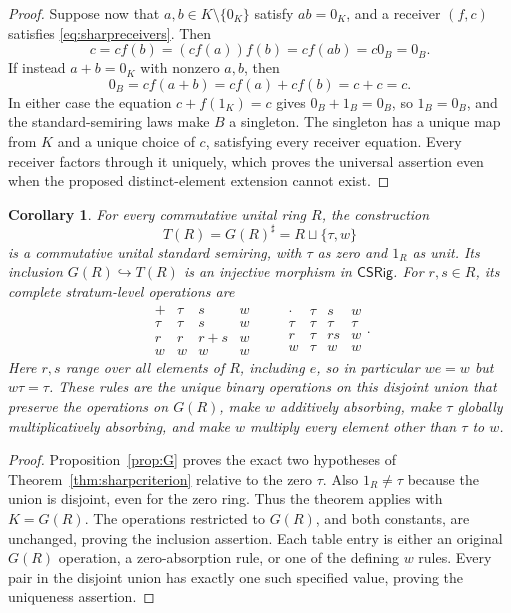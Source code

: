 \documentclass[11pt]{article}
\newtheorem{corollary}[theorem]{Corollary}
\theoremstyle{definition}
\newcommand{\SSS}{\mathsf{CSRig}}
\begin{document}
\begin{proof}
Suppose now that \(a,b\in K\setminus\{0_K\}\) satisfy \(ab=0_K\),
and a receiver \((f,c)\) satisfies \eqref{eq:sharpreceivers}. Then
\[
 c=cf(b)=(cf(a))f(b)=cf(ab)=c0_B=0_B.
\]
If instead \(a+b=0_K\) with nonzero \(a,b\), then
\[
 0_B=cf(a+b)=cf(a)+cf(b)=c+c=c.
\]
In either case the equation \(c+f(1_K)=c\) gives
\(0_B+1_B=0_B\), so \(1_B=0_B\), and the standard-semiring laws
make \(B\) a singleton. The singleton has a unique map from \(K\)
and a unique choice of \(c\), satisfying every receiver equation.
Every receiver factors through it uniquely, which proves the universal
assertion even when the proposed distinct-element extension cannot exist.
\end{proof}

\begin{corollary}\label{cor:T}
For every commutative unital ring \(R\), the construction
\[
 T(R)=G(R)^\sharp=R\sqcup\{\tau,w\}
\tag{18}\label{eq:T}
\]
is a commutative unital standard semiring, with \(\tau\) as zero and
\(1_R\) as unit. Its inclusion \(G(R)\hookrightarrow T(R)\) is
an injective morphism in \(\SSS\). For \(r,s\in R\), its complete
stratum-level operations are
\[
\begin{array}{c|ccc}
 +&\tau&s&w\\\hline
 \tau&\tau&s&w\\
 r&r&r+s&w\\
 w&w&w&w
\end{array}
\qquad
\begin{array}{c|ccc}
 \cdot&\tau&s&w\\\hline
 \tau&\tau&\tau&\tau\\
 r&\tau&rs&w\\
 w&\tau&w&w
\end{array}.
\tag{19}\label{eq:Ttable}
\]
Here \(r,s\) range over \emph{all} elements of \(R\), including
\(e\), so in particular \(we=w\) but \(w\tau=\tau\).
These rules are the unique binary operations on this disjoint union
that preserve the operations on \(G(R)\), make \(w\) additively
absorbing, make \(\tau\) globally multiplicatively absorbing, and
make \(w\) multiply every element other than \(\tau\) to \(w\).
\end{corollary}
\begin{proof}
Proposition~\ref{prop:G} proves the exact two hypotheses of
Theorem~\ref{thm:sharpcriterion} relative to the zero \(\tau\).
Also \(1_R\ne\tau\) because the union is disjoint, even for the
zero ring. Thus the theorem applies with \(K=G(R)\). The operations
restricted to \(G(R)\), and both constants, are unchanged, proving
the inclusion assertion. Each table entry is either an original
\(G(R)\) operation, a zero-absorption rule, or one of the defining
\(w\) rules. Every pair in the disjoint union has exactly one such
specified value, proving the uniqueness assertion.
\end{proof}
\end{document}
